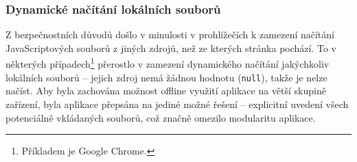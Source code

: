 \subsubsection{Dynamické načítání lokálních souborů}
Z bezpečnostních důvodů došlo v minulosti v prohlížečích k zamezení načítání JavaScriptových souborů z jiných zdrojů, než ze kterých stránka pochází. To v některých případech\footnote{Příkladem je Google Chrome.} přerostlo v zamezení dynamického načítání jakýchkoliv lokálních souborů -- jejich zdroj nemá žádnou hodnotu (\texttt{null}), takže je nelze načíst. Aby byla zachována možnost offline využití aplikace na větší skupině zařízení, byla aplikace přepsána na jediné možné řešení -- explicitní uvedení všech potenciálně vkládaných souborů, což značně omezilo modularitu aplikace.


% 
% 

